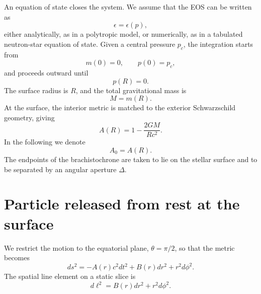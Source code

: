 \documentclass[
  aps,
  prd,
  twocolumn,
  nofootinbib,
  superscriptaddress,
  longbibliography
]{revtex4-2}
\begin{document}
An equation of state closes the system. We assume that the EOS can be
written as
\begin{equation}
\epsilon=\epsilon(p),
\end{equation}
either analytically, as in a polytropic model, or numerically, as in a
tabulated neutron-star equation of state. Given a central pressure
$p_c$, the integration starts from
\begin{equation}
m(0)=0,
\qquad
p(0)=p_c,
\end{equation}
and proceeds outward until
\begin{equation}
p(R)=0.
\end{equation}
The surface radius is $R$, and the total gravitational mass is
\begin{equation}
M=m(R).
\end{equation}
At the surface, the interior metric is matched to the exterior
Schwarzschild geometry, giving
\begin{equation}
A(R)
=
1-\frac{2GM}{Rc^2}.
\label{eq:surface_lapse}
\end{equation}
In the following we denote
\begin{equation}
A_0=A(R).
\label{eq:A0_def}
\end{equation}
The endpoints of the brachistochrone are taken to lie on the stellar
surface and to be separated by an angular aperture $\Delta$.

\section{Particle released from rest at the surface}

We restrict the motion to the equatorial plane,
$\theta=\pi/2$,
so that the metric becomes
\begin{equation}
ds^2
=
-A(r)c^2dt^2
+
B(r)dr^2
+
r^2d\phi^2.
\label{eq:equatorial_metric}
\end{equation}
The spatial line element on a static slice is
\begin{equation}
d\ell^2
=
B(r)dr^2+r^2d\phi^2.
\label{eq:spatial_line_element}
\end{equation}
\end{document}
